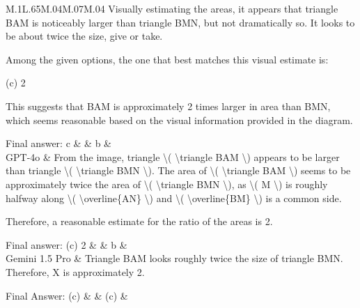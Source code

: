 \begin{table*}[t]
\begin{tabular}{M{.1\linewidth}L{.65\linewidth}M{.04\linewidth}M{.07\linewidth}M{.04\linewidth}}
Visually estimating the areas, it appears that triangle BAM is noticeably larger than triangle BMN, but not dramatically so. It looks to be about twice the size, give or take.

Among the given options, the one that best matches this visual estimate is:

(c) 2

This suggests that BAM is approximately 2 times larger in area than BMN, which seems reasonable based on the visual information provided in the diagram.

Final answer: c & \cmark & b & \xmark \\
\midrule
GPT-4o & From the image, triangle \textbackslash ( \textbackslash triangle BAM \textbackslash ) appears to be larger than triangle \textbackslash ( \textbackslash triangle BMN \textbackslash ). The area of \textbackslash ( \textbackslash triangle BAM \textbackslash ) seems to be approximately twice the area of \textbackslash ( \textbackslash triangle BMN \textbackslash ), as \textbackslash ( M \textbackslash ) is roughly halfway along \textbackslash ( \textbackslash overline\{AN\} \textbackslash ) and \textbackslash ( \textbackslash overline\{BM\} \textbackslash ) is a common side.

Therefore, a reasonable estimate for the ratio of the areas is 2.

Final answer: (c) 2 & \cmark & b & \xmark \\
\midrule
Gemini 1.5 Pro & Triangle BAM looks roughly twice the size of triangle BMN.  Therefore, X is approximately 2.

Final Answer: (c) & \cmark & (c) & \cmark \\
\bottomrule
    \end{tabular}
    \caption{Examples of dataset and model responses for \texttt{Geometry-Area} (3)} \label{tab:examples_Geometry-Area_3}%
\end{table*}
%
%
%
\clearpage
%
%
%
